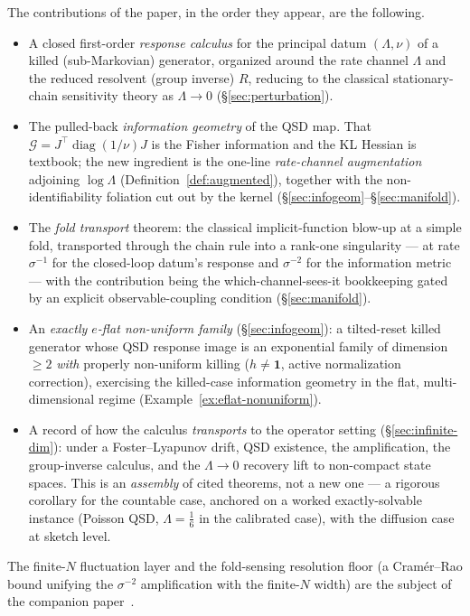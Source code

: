 \documentclass[11pt,reqno]{amsart}
\theoremstyle{plain}
\theoremstyle{definition}
\theoremstyle{remark}
\newcommand{\one}{\mathbf{1}}
\DeclareMathOperator{\diag}{diag}
\begin{document}
\smallskip
The contributions of the paper, in the order they appear, are the following.
\begin{itemize}[leftmargin=1.6em]
\item A closed first-order \emph{response calculus} for the principal datum
$(\Lambda,\nu)$ of a killed (sub-Markovian) generator, organized around the rate
channel $\Lambda$ and the reduced resolvent (group inverse) $R$, reducing to the
classical stationary-chain sensitivity theory as $\Lambda\to0$
(\S\ref{sec:perturbation}).
\item The pulled-back \emph{information geometry} of the QSD map. That
$\mathcal G=J^\top\diag(1/\nu)J$ is the Fisher information and the KL Hessian is
textbook; the new ingredient is the one-line \emph{rate-channel augmentation}
adjoining $\log\Lambda$ (Definition~\ref{def:augmented}), together with the
non-identifiability foliation cut out by the kernel
(\S\ref{sec:infogeom}--\S\ref{sec:manifold}).
\item The \emph{fold transport} theorem: the classical implicit-function blow-up at
a simple fold, transported through the chain rule into a rank-one singularity --- at rate
$\sigma^{-1}$ for the closed-loop datum's response and $\sigma^{-2}$ for the information
metric --- with the contribution being the which-channel-sees-it bookkeeping gated by
an explicit observable-coupling condition (\S\ref{sec:manifold}).
\item An \emph{exactly $e$-flat non-uniform family} (\S\ref{sec:infogeom}): a tilted-reset
killed generator whose QSD response image is an exponential family of dimension $\ge2$
\emph{with} properly non-uniform killing ($h\neq\one$, active normalization correction),
exercising the killed-case information geometry in the flat, multi-dimensional regime
(Example~\ref{ex:eflat-nonuniform}).
\item A record of how the calculus \emph{transports} to the operator setting
(\S\ref{sec:infinite-dim}): under a Foster--Lyapunov drift, QSD existence, the
amplification, the group-inverse calculus, and the $\Lambda\to0$ recovery lift to
non-compact state spaces. This is an \emph{assembly} of cited theorems, not a new one ---
a rigorous corollary for the countable case, anchored on a worked exactly-solvable
instance (Poisson QSD, $\Lambda=\tfrac16$ in the calibrated case), with the diffusion case
at sketch level.
\end{itemize}
The finite-$N$ fluctuation layer and the fold-sensing resolution floor (a Cram\'er--Rao
bound unifying the $\sigma^{-2}$ amplification with the finite-$N$ width) are the subject
of the companion paper~\cite{SarkarFoldSensing}.
\end{document}
